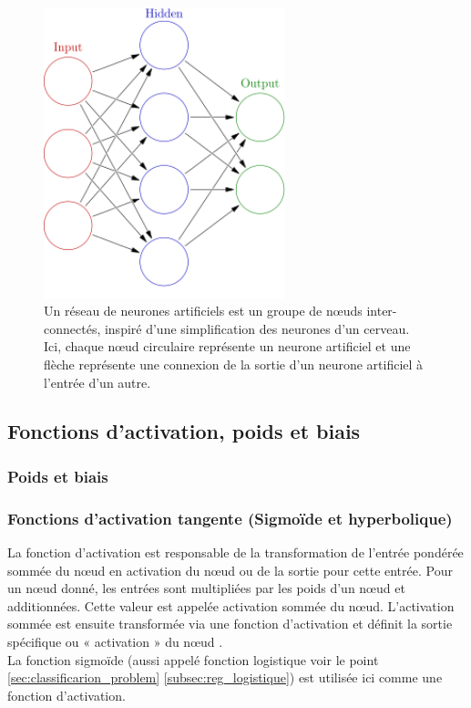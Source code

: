 	
	
	\begin{figure}[hth]%
		\centering
		\includegraphics[width=7cm]{images/colored_neural_network.png}
		\caption{Un réseau de neurones artificiels est un groupe de nœuds inter-connectés, inspiré d'une simplification des neurones d'un cerveau. Ici, chaque nœud circulaire représente un neurone artificiel et une flèche représente une connexion de la sortie d'un neurone artificiel à l'entrée d'un autre.}
		\label{fig:colored_neural_network}
	\end{figure}
	
	\subsection{Fonctions d'activation, poids et biais} \label{sec:activation_weight}
	
	\subsubsection{Poids et biais}
	
	\subsubsection{Fonctions d'activation tangente (Sigmoïde et  hyperbolique)}
	La fonction d'activation est responsable de la transformation de l'entrée pondérée sommée du nœud en activation du nœud ou de la sortie pour cette entrée.
	Pour un nœud donné, les entrées sont multipliées par les poids d'un nœud et additionnées. Cette valeur est appelée activation sommée du nœud. L'activation sommée est ensuite transformée via une fonction d'activation et définit la sortie spécifique ou « activation » du nœud \cite{ml2008python}.\\
	La fonction sigmoïde (aussi appelé fonction logistique voir le point \ref{sec:classificarion_problem} \ref{subsec:reg_logistique}) est utilisée ici comme une fonction d'activation.	
	
